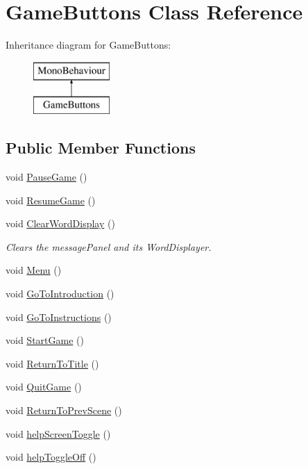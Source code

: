 \hypertarget{class_game_buttons}{}\section{Game\+Buttons Class Reference}
\label{class_game_buttons}
Inheritance diagram for Game\+Buttons\+:\begin{figure}[H]
\begin{center}
\leavevmode
\includegraphics[height=2.000000cm]{class_game_buttons}
\end{center}
\end{figure}
\subsection*{Public Member Functions}
\begin{DoxyCompactItemize}
\item 
void \hyperlink{class_game_buttons_aa6666b810a7a0caff54b55d473be24c9}{Pause\+Game} ()
\item 
void \hyperlink{class_game_buttons_af088dcf9d9b5393c1c22bf2122cffe35}{Resume\+Game} ()
\item 
void \hyperlink{class_game_buttons_aa55857210a186acda2b262d2cab348b8}{Clear\+Word\+Display} ()
\begin{DoxyCompactList}\small\item\em Clears the message\+Panel and it\textquotesingle{}s Word\+Displayer. \end{DoxyCompactList}\item 
void \hyperlink{class_game_buttons_a64856a3c989ce3d14db961766db49425}{Menu} ()
\item 
void \hyperlink{class_game_buttons_a53eb5843078798e6617647ae83bfbc1e}{Go\+To\+Introduction} ()
\item 
void \hyperlink{class_game_buttons_ac91982c8a1409e977ceb47220fd7112a}{Go\+To\+Instructions} ()
\item 
void \hyperlink{class_game_buttons_acfb2c2af597071c65abe2535199bf5d9}{Start\+Game} ()
\item 
void \hyperlink{class_game_buttons_aa24ecd9e57ec9e74b94d2e974655c630}{Return\+To\+Title} ()
\item 
void \hyperlink{class_game_buttons_a0bf79754f2ddf3fcc4059e9179b74024}{Quit\+Game} ()
\item 
void \hyperlink{class_game_buttons_a38fd8fbd392123bfa94d3a291afd725e}{Return\+To\+Prev\+Scene} ()
\item 
void \hyperlink{class_game_buttons_a1ca7b15fb784ed277bc107613d95606d}{help\+Screen\+Toggle} ()
\item 
void \hyperlink{class_game_buttons_a2a81335687a2eb013f83fccf7394f57d}{help\+Toggle\+Off} ()
\end{DoxyCompactItemize}
